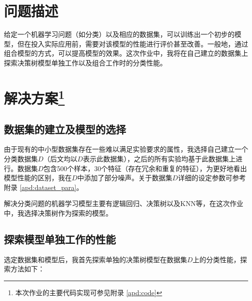\documentclass[12pt,a4paper]{article}
\theoremstyle{definition}
\begin{document}
\noindent
\noindent{}

\section{问题描述}

给定一个机器学习问题（如分类）以及相应的数据集，可以训练出一个初步的模型，但在投入实际应用前，需要对该模型的性能进行评价甚至改善。一般地，通过组合模型的方式，可以提高模型的效果。这次作业中，我将在自己建立的数据集上探索决策树模型单独工作以及组合工作时的分类性能。

\section{解决方案\protect\footnote{本次作业的主要代码实现可参见附录 \ref{apd:code}}}

\subsection{数据集的建立及模型的选择}

由于现有的中小型数据集存在一些难以满足实验要求的属性，我选择自己建立一个分类数据集$D$（后文均以$D$表示此数据集），之后的所有实验均基于此数据集上进行。数据集$D$包含500个样本，30个特征（存在冗余和重复的特征），为更好地看出模型性能的区别，我在$D$中添加了部分噪声。关于数据集$D$详细的设定参数可参考附录 \ref{apd:dataset_para}。

\vspace{0.015\linewidth}
解决分类问题的机器学习模型主要有逻辑回归、决策树以及KNN等，在这次作业中，我选择决策树作为探索的模型。

\subsection{探索模型单独工作的性能}

选定数据集和模型后，我首先探索单独的决策树模型在数据集$D$上的分类性能，探索方法如下：
\end{document}
